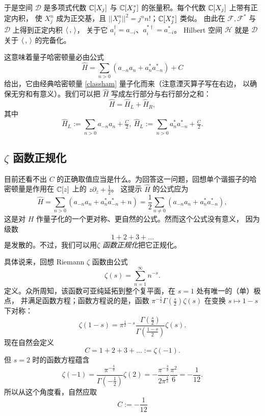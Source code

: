 于是空间 $\mathcal D$ 是多项式代数 $\Bbb C[X_j]$
与 $\Bbb C[X_j^*]$ 的张量积。每个代数 $\Bbb C[X_j]$ 上带有正定内积，
使 $X_j^n$ 成为正交基，且 $||X_j^n||^2=j^nn!$；$\Bbb C[X_j^*]$ 类似。
由此在 $\mathcal F,\mathcal F^*$ 与 $\mathcal D$ 上得到正定内积 $\la,\ra$，
关于它 $a_i^\dagger=a_{-i}$、$a_i^{*\dagger}=a_{-i}^*$。
Hilbert 空间 $\mathcal H$ 就是 $\mathcal D$ 关于 $\la,\ra$ 的完备化。


这意味着量子哈密顿量必由公式
$$
\widehat H=\sum_{n>0}(a_{-n}a_n+a_n^*a_{-n}^*)+C
$$
给出，它由经典哈密顿量 \eqref{classham} 量子化而来（注意湮灭算子写在右边，
以确保无穷和有意义）。我们可以把 $\widehat H$ 写成左行部分与右行部分之和：
$$
\widehat H=\widehat H_L+\widehat H_R,
$$
其中
$$
\widehat H_L:=\sum_{n>0}a_{-n}a_n+\tfrac{C}{2},\ \widehat H_L:=\sum_{n>0}a_{n}^*a_{-n}^*+\tfrac{C}{2}.
$$


\subsection{$\zeta$ 函数正规化} 
目前还看不出 $C$ 的正确取值应当是什么。为回答这一问题，回想单个谐振子的哈密顿量是作用在 $\Bbb C[z]$ 上的 $z\partial_z+\frac{1}{2}$。
这提示 $\widehat H$ 的公式应为
$$
\widehat H=\sum_{n>0}(a_{-n}a_n+a_n^*a_{-n}^*+n)=\frac{1}{2}\sum_{n\ne 0} (a_{-n}a_n+a_n^*a_{-n}^*),
$$
这是对 $H$ 作量子化的一个更对称、更自然的公式。然而这个公式没有意义，
因为级数
$$
1+2+3+...
$$ 
是发散的。不过，我们可以用\emph{$\zeta$ 函数正规化}把它正规化。

具体说来，回想 Riemann $\zeta$ 函数由公式
$$
\zeta(s)=\sum_{n=1}^\infty n^{-s}.
$$
定义。众所周知，该函数可亚纯延拓到整个复平面，在 $s=1$ 处有唯一的（单）极点，
并满足函数方程；函数方程说的是，函数 $\pi^{-\frac{s}{2}}\Gamma(\tfrac{s}{2})\zeta(s)$
在变换 $s\mapsto 1-s$ 下对称：
$$
\zeta(1-s)=\pi^{\frac{1}{2}-s}\frac{\Gamma(\tfrac{s}{2})}{\Gamma(\tfrac{1-s}{2})}\zeta(s).
$$
现在自然会定义
$$
C=1+2+3+...:=\zeta(-1).
$$
但 $s=2$ 时的函数方程蕴含
$$
\zeta(-1)=\frac{\pi^{-\frac{3}{2}}}{\Gamma(-\frac{1}{2})}\zeta(2)=-\frac{\pi^{-\frac{3}{2}}}{2\pi^{\frac{1}{2}}}\frac{\pi^2}{6}=-\frac{1}{12}.
$$
所以从这个角度看，自然应取
$$
C:=-\frac{1}{12}
$$

